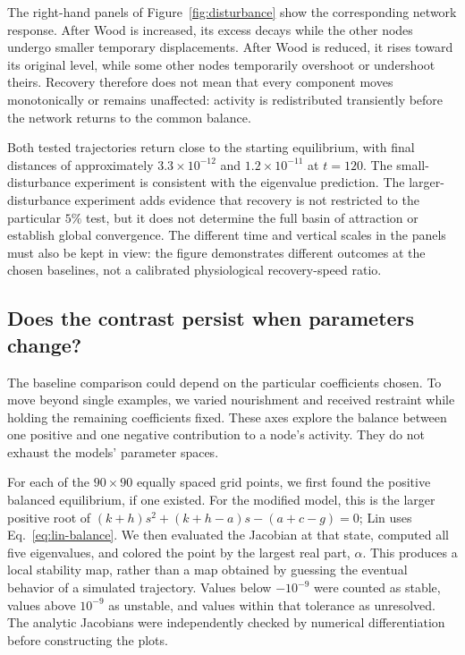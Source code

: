 The right-hand panels of Figure~\ref{fig:disturbance} show the corresponding
network response. After Wood is increased, its excess decays while the
other nodes undergo smaller temporary displacements. After Wood is reduced,
it rises toward its original level, while some other nodes temporarily
overshoot or undershoot theirs. Recovery therefore does not mean that
every component moves monotonically or remains unaffected: activity is
redistributed transiently before the network returns to the common balance.

Both tested trajectories return close to the starting equilibrium, with
final distances of approximately $3.3\times10^{-12}$ and
$1.2\times10^{-11}$ at $t=120$. The small-disturbance experiment is
consistent with the eigenvalue prediction. The larger-disturbance experiment
adds evidence that recovery is not restricted to the particular $5\%$
test, but it does not determine the full basin of attraction or establish
global convergence. The different time and vertical scales in the panels
must also be kept in view: the figure demonstrates different outcomes at
the chosen baselines, not a calibrated physiological recovery-speed ratio.

\subsection{Does the contrast persist when parameters change?}
The baseline comparison could depend on the particular coefficients chosen.
To move beyond single examples, we varied nourishment and received restraint
while holding the remaining coefficients fixed. These axes explore the
balance between one positive and one negative contribution to a node's
activity. They do not exhaust the models' parameter spaces.

For each of the $90\times90$ equally spaced grid points, we first found
the positive balanced equilibrium, if one existed. For the modified model,
this is the larger positive root of
$(k+h)s^2+(k+h-a)s-(a+c-g)=0$; Lin uses
Eq.~\eqref{eq:lin-balance}. We then evaluated the Jacobian at that state,
computed all five eigenvalues, and colored the point by the largest real
part, $\alpha$. This produces a local stability map, rather than a map
obtained by guessing the eventual behavior of a simulated trajectory.
Values below $-10^{-9}$ were counted as stable, values above $10^{-9}$ as
unstable, and values within that tolerance as unresolved. The analytic
Jacobians were independently checked by numerical differentiation before
constructing the plots.

